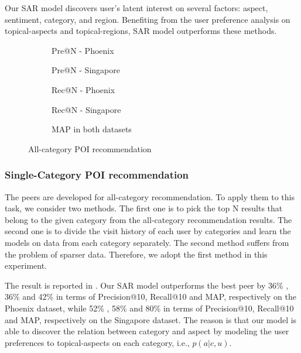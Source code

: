 Our SAR model discovers user's latent interest on
several factors: aspect, sentiment, category, and region. Benefiting
from the user preference analysis on topical-aspects
and topical-regions, SAR model outperforms these methods.

\begin{figure*}[th]
\begin{subfigure}[t]{0.4\columnwidth}
\centering
{}
\caption{Pre@N - Phoenix}
\end{subfigure}
\begin{subfigure}[t]{0.4\columnwidth}
\centering
{}
\caption{Pre@N - Singapore}
\end{subfigure}
\begin{subfigure}[t]{0.4\columnwidth}
\centering
{}
\caption{Rec@N - Phoenix}
\end{subfigure}
\begin{subfigure}[t]{0.4\columnwidth}
\centering
{}
\caption{Rec@N - Singapore}
\end{subfigure}
\begin{subfigure}[t]{0.4\columnwidth}
\centering
{}
\caption{MAP in both datasets}
\end{subfigure}
\caption{All-category POI recommendation}
\label{fig:poi}
\end{figure*}

\subsubsection{Single-Category POI recommendation}
The peers are developed for all-category recommendation.
To apply them to this task, we consider
two methods. The first one is to pick the top N results
that belong to the given category from the all-category
recommendation results. The second one is to divide the
visit history of each user by categories and learn the
models on data from each category separately.
The second method suffers from the problem of sparser data.
Therefore, we adopt the first method in this experiment.

The result is reported
in .
Our SAR model outperforms
the best peer by 36\% , 36\% and 42\% in terms of
Precision@10, Recall@10 and MAP, respectively
on the Phoenix dataset, while 52\% ,
58\% and 80\% in terms of
Precision@10, Recall@10 and MAP, respectively
on the Singapore dataset.
The reason is that
our model is able to discover the
relation between category and aspect by modeling the user
preferences to topical-aspects on each category, i.e., $p(a|c,u)$.

